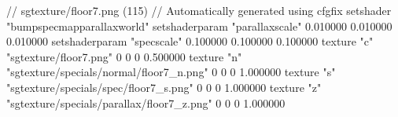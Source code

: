 // sgtexture/floor7.png (115)
// Automatically generated using cfgfix
setshader "bumpspecmapparallaxworld"
setshaderparam "parallaxscale" 0.010000 0.010000 0.010000
setshaderparam "specscale" 0.100000 0.100000 0.100000
texture "c" "sgtexture/floor7.png" 0 0 0 0.500000
texture "n" "sgtexture/specials/normal/floor7_n.png" 0 0 0 1.000000
texture "s" "sgtexture/specials/spec/floor7_s.png" 0 0 0 1.000000
texture "z" "sgtexture/specials/parallax/floor7_z.png" 0 0 0 1.000000
